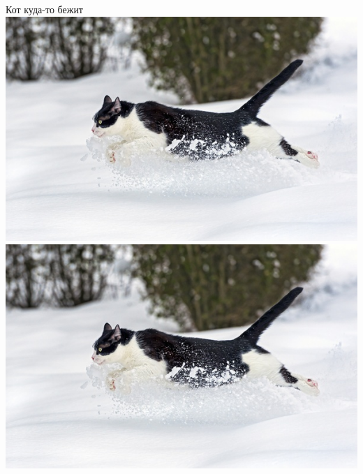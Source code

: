 \documentclass{article}
\begin{document}
Кот куда-то бежит \\
\includegraphics[scale=0.25]{cat.jpg} \\

\includegraphics[scale=0.25, right]{cat.jpg}
\end{document}
